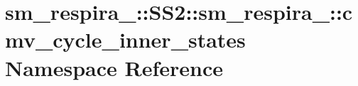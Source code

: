 \hypertarget{namespacesm__respira__1_1_1SS2_1_1sm__respira__1_1_1cmv__cycle__inner__states}{}\section{sm\+\_\+respira\+\_\+:\+:S\+S2\+:\+:sm\+\_\+respira\+\_\+:\+:cmv\+\_\+cycle\+\_\+inner\+\_\+states Namespace Reference}
\label{namespacesm__respira__1_1_1SS2_1_1sm__respira__1_1_1cmv__cycle__inner__states}
